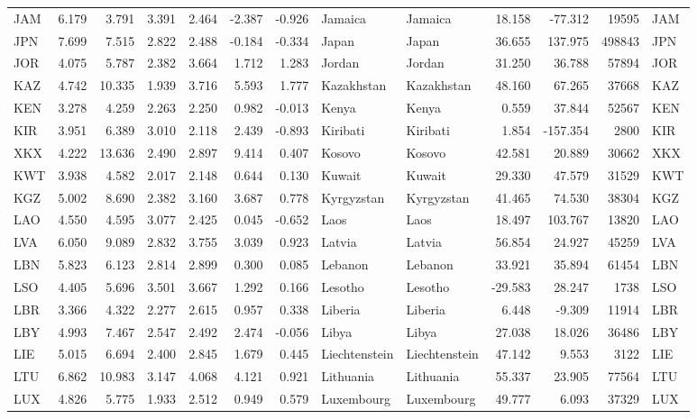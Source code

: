 \begin{tabular}{lrrrrrrllrrrl}
JAM & 6.179 & 3.791 & 3.391 & 2.464 & -2.387 & -0.926 & Jamaica & Jamaica & 18.158 & -77.312 & 19595 & JAM \\
JPN & 7.699 & 7.515 & 2.822 & 2.488 & -0.184 & -0.334 & Japan & Japan & 36.655 & 137.975 & 498843 & JPN \\
JOR & 4.075 & 5.787 & 2.382 & 3.664 & 1.712 & 1.283 & Jordan & Jordan & 31.250 & 36.788 & 57894 & JOR \\
KAZ & 4.742 & 10.335 & 1.939 & 3.716 & 5.593 & 1.777 & Kazakhstan & Kazakhstan & 48.160 & 67.265 & 37668 & KAZ \\
KEN & 3.278 & 4.259 & 2.263 & 2.250 & 0.982 & -0.013 & Kenya & Kenya & 0.559 & 37.844 & 52567 & KEN \\
KIR & 3.951 & 6.389 & 3.010 & 2.118 & 2.439 & -0.893 & Kiribati & Kiribati & 1.854 & -157.354 & 2800 & KIR \\
XKX & 4.222 & 13.636 & 2.490 & 2.897 & 9.414 & 0.407 & Kosovo & Kosovo & 42.581 & 20.889 & 30662 & XKX \\
KWT & 3.938 & 4.582 & 2.017 & 2.148 & 0.644 & 0.130 & Kuwait & Kuwait & 29.330 & 47.579 & 31529 & KWT \\
KGZ & 5.002 & 8.690 & 2.382 & 3.160 & 3.687 & 0.778 & Kyrgyzstan & Kyrgyzstan & 41.465 & 74.530 & 38304 & KGZ \\
LAO & 4.550 & 4.595 & 3.077 & 2.425 & 0.045 & -0.652 & Laos & Laos & 18.497 & 103.767 & 13820 & LAO \\
LVA & 6.050 & 9.089 & 2.832 & 3.755 & 3.039 & 0.923 & Latvia & Latvia & 56.854 & 24.927 & 45259 & LVA \\
LBN & 5.823 & 6.123 & 2.814 & 2.899 & 0.300 & 0.085 & Lebanon & Lebanon & 33.921 & 35.894 & 61454 & LBN \\
LSO & 4.405 & 5.696 & 3.501 & 3.667 & 1.292 & 0.166 & Lesotho & Lesotho & -29.583 & 28.247 & 1738 & LSO \\
LBR & 3.366 & 4.322 & 2.277 & 2.615 & 0.957 & 0.338 & Liberia & Liberia & 6.448 & -9.309 & 11914 & LBR \\
LBY & 4.993 & 7.467 & 2.547 & 2.492 & 2.474 & -0.056 & Libya & Libya & 27.038 & 18.026 & 36486 & LBY \\
LIE & 5.015 & 6.694 & 2.400 & 2.845 & 1.679 & 0.445 & Liechtenstein & Liechtenstein & 47.142 & 9.553 & 3122 & LIE \\
LTU & 6.862 & 10.983 & 3.147 & 4.068 & 4.121 & 0.921 & Lithuania & Lithuania & 55.337 & 23.905 & 77564 & LTU \\
LUX & 4.826 & 5.775 & 1.933 & 2.512 & 0.949 & 0.579 & Luxembourg & Luxembourg & 49.777 & 6.093 & 37329 & LUX \\

\end{tabular}
